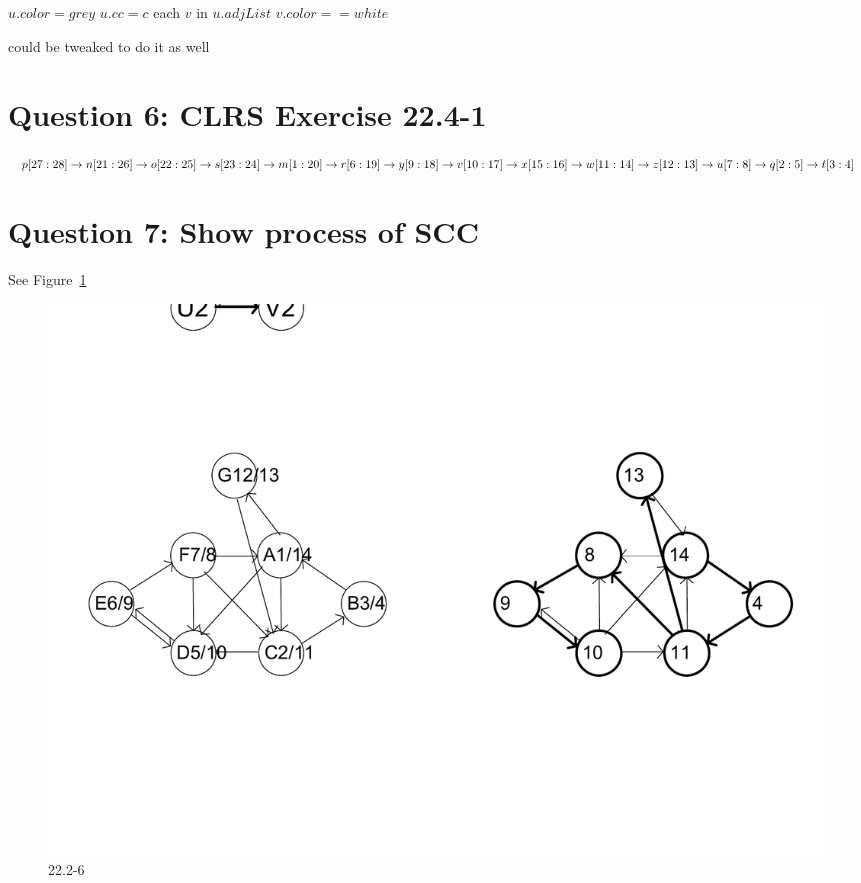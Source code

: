 \documentclass[]{article}
\begin{document}
\begin{codebox}
	
	\li $u.color = grey$
	\li $u.cc = c$
	\li	\For each $v$ in $u.adjList$
	\li \Do \If $v.color == white$
	\li 	\Then {}
	\End
	\End
	
\end{codebox}

 could be tweaked to do it as well

\section{Question 6: CLRS Exercise 22.4-1}

$ p[27:28] \rightarrow n[21:26] \rightarrow o[22:25] \rightarrow s[23:24] \rightarrow\\
m[1:20] \rightarrow r[6:19] \rightarrow y[9:18] \rightarrow v[10:17] \rightarrow x[15:16] \rightarrow \\
w[11:14] \rightarrow z[12:13] \rightarrow u[7:8] \rightarrow q[2:5] \rightarrow t[3:4]$

\section{Question 7: Show process of SCC}

See Figure~\ref{fig:hw04Ex7}

\begin{figure}
	\centering
	\includegraphics[width=\linewidth]{hw04Ex7}
	\caption{22.2-6}
	\label{fig:hw04Ex7}
\end{figure}
\end{document}
